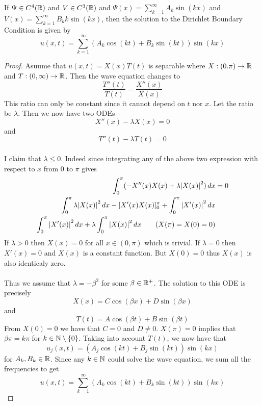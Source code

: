 \documentclass[a4paper]{article}
\begin{document}
\begin{prp}{}{} If $\Psi\in C^4(\mathbb{R})$ and $V\in C^3(\mathbb{R})$ and $\Psi(x)=\sum_{k=1}^\infty A_k\sin(kx)$ and $V(x)=\sum_{k=1}^\infty B_kk\sin(kx)$, then the solution to the Dirichlet Boundary Condition is given by $$u(x,t)=\sum_{k=1}^\infty\left(A_k\cos(kt)+B_k\sin(kt)\right)\sin(kx)$$ \tcbline
\begin{proof}
Asuume that $u(x,t)=X(x)T(t)$ is separable where $X:(0.\pi)\to\mathbb{R}$ and $T:(0,\infty)\to\mathbb{R}$. Then the wave equation changes to $$\frac{T''(t)}{T(t)}=\frac{X''(x)}{X(x)}$$ This ratio can only be constant since it cannot depend on $t$ nor $x$. Let the ratio be $\lambda$. Then we now have two ODEs $$X''(x)-\lambda X(x)=0$$ and $$T''(t)-\lambda T(t)=0$$~\\
I claim that $\lambda\leq 0$. Indeed since integrating any of the above two expression with respect to $x$ from $0$ to $\pi$ gives
\begin{align*}
\int_0^\pi(-X''(x)X(x)+\lambda\abs{X(x)}^2)\,dx&=0\\
\int_0^\pi\lambda\abs{X(x)}^2\,dx-[X'(x)X(x)]_0^\pi+\int_0^\pi\abs{X'(x)}^2\,dx\\
\int_0^\pi\abs{X'(x)}^2\,dx+\lambda\int_0^\pi\abs{X(x)}^2\,dx\tag{$X(\pi)=X(0)=0$}
\end{align*}
If $\lambda>0$ then $X(x)=0$ for all $x\in(0,\pi)$ which is trivial. If $\lambda=0$ then $X'(x)=0$ and $X(x)$ is a constant function. But $X(0)=0$ thus $X(x)$ is also identicaly zero. \\~\\
Thus we assume that $\lambda=-\beta^2$ for some $\beta\in\mathbb{R}^+$. The solution to this ODE is precisely $$X(x)=C\cos(\beta x)+D\sin(\beta x)$$ and $$T(t)=A\cos(\beta t)+B\sin(\beta t)$$ From $X(0)=0$ we have that $C=0$ and $D\neq 0$. $X(\pi)=0$ implies that $\beta\pi=k\pi$ for $k\in\mathbb{N}\setminus\{0\}$. Taking into account $T(t)$, we now have that $$u_j(x,t)=(A_j\cos(kt)+B_j\sin(kt))\sin(kx)$$ for $A_k,B_k\in\mathbb{R}$. Since any $k\in\mathbb{N}$ could solve the wave equation, we sum all the frequencies to get $$u(x,t)=\sum_{k=1}^\infty(A_k\cos(kt)+B_k\sin(kt))\sin(kx)$$
\end{proof}
\end{prp}
\end{document}
